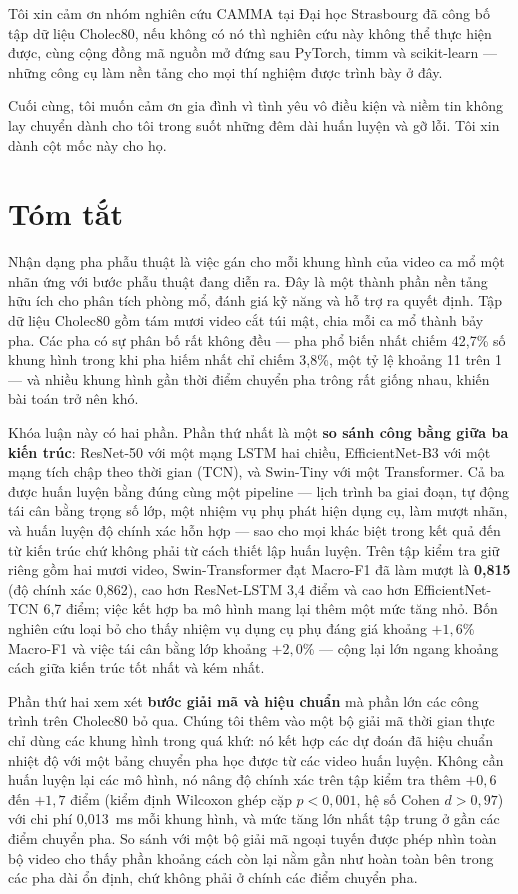 \documentclass[11pt,a4paper]{report}
\begin{document}
Tôi xin cảm ơn nhóm nghiên cứu CAMMA tại Đại học Strasbourg đã công bố tập dữ liệu Cholec80, nếu không có nó thì nghiên cứu này không thể thực hiện được, cùng cộng đồng mã nguồn mở đứng sau PyTorch, timm và scikit-learn --- những công cụ làm nền tảng cho mọi thí nghiệm được trình bày ở đây.

Cuối cùng, tôi muốn cảm ơn gia đình vì tình yêu vô điều kiện và niềm tin không lay chuyển dành cho tôi trong suốt những đêm dài huấn luyện và gỡ lỗi. Tôi xin dành cột mốc này cho họ.

\chapter*{Tóm tắt}

Nhận dạng pha phẫu thuật là việc gán cho mỗi khung hình của video ca mổ một nhãn ứng với bước phẫu thuật đang diễn ra. Đây là một thành phần nền tảng hữu ích cho phân tích phòng mổ, đánh giá kỹ năng và hỗ trợ ra quyết định. Tập dữ liệu Cholec80 gồm tám mươi video cắt túi mật, chia mỗi ca mổ thành bảy pha. Các pha có sự phân bố rất không đều --- pha phổ biến nhất chiếm 42,7\% số khung hình trong khi pha hiếm nhất chỉ chiếm 3,8\%, một tỷ lệ khoảng 11 trên 1 --- và nhiều khung hình gần thời điểm chuyển pha trông rất giống nhau, khiến bài toán trở nên khó.

Khóa luận này có hai phần. Phần thứ nhất là một \textbf{so sánh công bằng giữa ba kiến trúc}: ResNet-50 với một mạng LSTM hai chiều, EfficientNet-B3 với một mạng tích chập theo thời gian (TCN), và Swin-Tiny với một Transformer. Cả ba được huấn luyện bằng đúng cùng một pipeline --- lịch trình ba giai đoạn, tự động tái cân bằng trọng số lớp, một nhiệm vụ phụ phát hiện dụng cụ, làm mượt nhãn, và huấn luyện độ chính xác hỗn hợp --- sao cho mọi khác biệt trong kết quả đến từ kiến trúc chứ không phải từ cách thiết lập huấn luyện. Trên tập kiểm tra giữ riêng gồm hai mươi video, Swin-Transformer đạt Macro-F1 đã làm mượt là \textbf{0,815} (độ chính xác 0,862), cao hơn ResNet-LSTM 3,4 điểm và cao hơn EfficientNet-TCN 6,7 điểm; việc kết hợp ba mô hình mang lại thêm một mức tăng nhỏ. Bốn nghiên cứu loại bỏ cho thấy nhiệm vụ dụng cụ phụ đáng giá khoảng $+1{,}6\%$ Macro-F1 và việc tái cân bằng lớp khoảng $+2{,}0\%$ --- cộng lại lớn ngang khoảng cách giữa kiến trúc tốt nhất và kém nhất.

Phần thứ hai xem xét \textbf{bước giải mã và hiệu chuẩn} mà phần lớn các công trình trên Cholec80 bỏ qua. Chúng tôi thêm vào một bộ giải mã thời gian thực chỉ dùng các khung hình trong quá khứ: nó kết hợp các dự đoán đã hiệu chuẩn nhiệt độ với một bảng chuyển pha học được từ các video huấn luyện. Không cần huấn luyện lại các mô hình, nó nâng độ chính xác trên tập kiểm tra thêm $+0{,}6$ đến $+1{,}7$ điểm (kiểm định Wilcoxon ghép cặp $p < 0{,}001$, hệ số Cohen $d > 0{,}97$) với chi phí 0,013~ms mỗi khung hình, và mức tăng lớn nhất tập trung ở gần các điểm chuyển pha. So sánh với một bộ giải mã ngoại tuyến được phép nhìn toàn bộ video cho thấy phần khoảng cách còn lại nằm gần như hoàn toàn bên trong các pha dài ổn định, chứ không phải ở chính các điểm chuyển pha.
\end{document}
